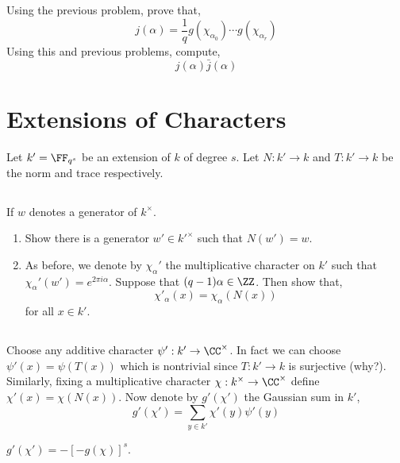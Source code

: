 \documentclass[12pt]{article}
\begin{document}
\subsection{} \label{computing_j}

Using the previous problem, prove that,
\[ j(\alpha) = \frac{1}{q} g(\chi_{\alpha_0}) \cdots g(\chi_{\alpha_r}) \]
Using this and previous problems, compute,
\[ j(\alpha) \bar{j}(\alpha) \]

\section{Extensions of Characters}

Let $k' = \FF_{q^s}$ be an extension of $k$ of degree $s$. Let $N : k' \to k$ and $T : k' \to k$ be the norm and trace respectively.

\subsection{}

If $w$ denotes a generator of $k^\times$. 

\begin{enumerate}
\item Show there is a generator $w' \in k'^\times$ such that $N(w') = w$.

\item As before, we denote by $\chi_\alpha'$ the multiplicative character on $k'$ such that $\chi_{\alpha}'(w') = e^{2 \pi i \alpha}$. Suppose that $(q-1) \alpha \in \ZZ$. Then show that,
\[ \chi'_\alpha(x) = \chi_\alpha(N(x)) \]
for all $x \in k'$.
\end{enumerate}

\subsection{}

Choose any additive character $\psi' : k' \to \CC^\times$. In fact we can choose $\psi'(x) = \psi(T(x))$ which is nontrivial since $T : k' \to k$ is surjective (why?). Similarly, fixing a multiplicative character $\chi : k^\times \to \CC^\times$ define $\chi'(x) = \chi(N(x))$.  Now denote by $g'(\chi')$ the Gaussian sum in $k'$,
\[ g'(\chi') = \sum_{y \in k'} \chi'(y) \psi'(y) \]

\begin{theorem}
$g'(\chi') = - [-g(\chi)]^s$.
\end{theorem}
\end{document}
